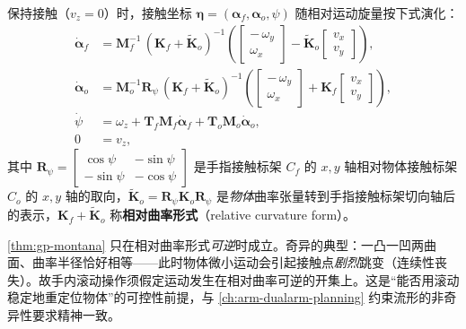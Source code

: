 \begin{theorem}\label{thm:gp-montana}
保持接触（$v_z=0$）时，接触坐标 $\boldsymbol{\eta}=(\boldsymbol{\alpha}_f,\boldsymbol{\alpha}_o,\psi)$ 随相对运动旋量按下式演化：
\begin{align}
  \dot{\boldsymbol{\alpha}}_f&=\mathbf{M}_f^{-1}\,(\mathbf{K}_f+\widetilde{\mathbf{K}}_o)^{-1}
    \left(\begin{bmatrix}-\,\omega_y\\[1pt] \omega_x\end{bmatrix}
    -\widetilde{\mathbf{K}}_o\begin{bmatrix}v_x\\ v_y\end{bmatrix}\right),
  \label{eq:gp-montana-f}\\[2pt]
  \dot{\boldsymbol{\alpha}}_o&=\mathbf{M}_o^{-1}\mathbf{R}_\psi\,(\mathbf{K}_f+\widetilde{\mathbf{K}}_o)^{-1}
    \left(\begin{bmatrix}-\,\omega_y\\[1pt] \omega_x\end{bmatrix}
    +\mathbf{K}_f\begin{bmatrix}v_x\\ v_y\end{bmatrix}\right),
  \label{eq:gp-montana-o}\\[2pt]
  \dot{\psi}&=\omega_z+\mathbf{T}_f\mathbf{M}_f\dot{\boldsymbol{\alpha}}_f+\mathbf{T}_o\mathbf{M}_o\dot{\boldsymbol{\alpha}}_o,
  \label{eq:gp-montana-psi}\\[2pt]
  0&=v_z,
  \label{eq:gp-montana-vz}
\end{align}
其中 $\mathbf{R}_\psi=\begin{bmatrix}\cos\psi & -\sin\psi\\ -\sin\psi & -\cos\psi\end{bmatrix}$ 是手指接触标架 $C_f$ 的 $x,y$ 轴相对物体接触标架 $C_o$ 的 $x,y$ 轴的取向，$\widetilde{\mathbf{K}}_o=\mathbf{R}_\psi\mathbf{K}_o\mathbf{R}_\psi$ 是\emph{物体}曲率张量转到手指接触标架切向轴后的表示，$\mathbf{K}_f+\widetilde{\mathbf{K}}_o$ 称\textbf{相对曲率形式}（relative curvature form）。
\end{theorem}

\begin{note}
\cref{thm:gp-montana} 只在相对曲率形式\emph{可逆}时成立。奇异的典型：一凸一凹两曲面、曲率半径恰好相等——此时物体微小运动会引起接触点\emph{剧烈}跳变（连续性丧失）。故手内滚动操作须假定运动发生在相对曲率可逆的开集上。这是“能否用滚动稳定地重定位物体”的可控性前提，与 \cref{ch:arm-dualarm-planning} 约束流形的非奇异性要求精神一致。
\end{note}

